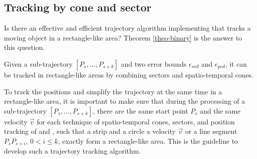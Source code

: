 \subsection{Tracking by cone and sector}

Is there an effective and efficient trajectory algorithm implementing \bed that tracks a moving object in a rectangle-like area? Theorem \ref{theo-binary} is the answer to this question.
\begin{theorem}
	\label{theo-binary}
	Given a sub-trajectory $[P_s,...,P_{s+k}]$ and two error bounds $\epsilon_{sed}$ and $\epsilon_{ped}$, it can be tracked in rectangle-like areas by combining sectors and spatio-temporal cones.
\end{theorem}

To track the positions and simplify the trajectory at the same time in a rectangle-like area, it is important to make sure that during the processing of a sub-trajectory $[P_s,...,P_{s+k}]$, there are the same start point $P_s$ and the same velocity $\vec{v}$ for each technique of spatio-temporal cones, sectors, and position tracking of \ped and \sed, such that a strip and a circle \wrt a velocity $\vec{v}$ or a line segment $\overline{P_sP_{s+i}}$, $0<i\le k$, exactly form a rectangle-like area. This is the guideline to develop such a trajectory tracking algorithm. 








